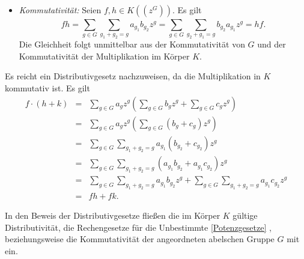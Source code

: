 {\begin{itemize}
%
%
%
%
\item \textit{Kommutativität:} Seien $f,h \in K\left(\left(z^{G}\right)\right)$. Es gilt 
\[fh = \sum_{g \in G}^{}\sum_{g_1 + g_2 = g}^{}a_{g_1} b_{g_2}z^g = \sum_{g \in G}^{}\sum_{g_2 + g_1 = g}^{}b_{g_2} a_{g_1}z^g = hf.\]
Die Gleichheit folgt unmittelbar aus der Kommutativität von $G$ und der Kommutativität der Multiplikation im Körper $K$.\\
\end{itemize}

Es reicht ein Distributivgesetz nachzuweisen, da die Multiplikation in $K$ kommutativ ist. Es gilt
\begin{eqnarray*}
f \cdot(h + k) &=& \sum_{g \in G}^{} a_g z^g  \left(\sum_{g \in G}^{} b_g z^g + \sum_{g \in G}^{} c_g z^g\right) \\
&=& \sum_{g \in G}^{} a_g z^g  \left(\sum_{g \in G}^{} \left(b_g + c_g\right) z^g \right)\\
&=& \sum_{g \in G}^{} \sum_{g_1 + g_2 = g}^{} a_{g_1}{\left(b_{g_2} + c_{g_2}\right)} z^g \\
&=& \sum_{g \in G}^{} \sum_{g_1 + g_2= g}^{} \left(a_{g_1}b_{g_2} + a_{g_1}c_{g_2}\right) z^g \\
&=& \sum_{g \in G}^{} \sum_{g_1 + g_2= g}^{} a_{g_1}b_{g_2}z^g + \sum_{g \in G}^{} \sum_{g_1 + g_2= g}^{} a_{g_1}c_{g_2} z^g \\
&=& fh + fk.
\end{eqnarray*}
%
%
%
% 
%
 
In den Beweis der Distributivgesetze fließen die im Körper $K$ gültige Distributivität, die Rechengesetze für die Unbestimmte \ref{Potenzgesetze}
, beziehungsweise die Kommutativität der angeordneten abelschen Gruppe $G$ mit ein.  
}
%
